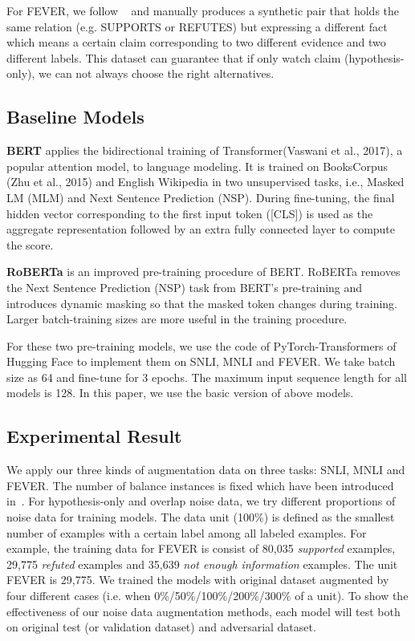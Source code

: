 For FEVER, we follow ~\shortcite{} and manually produces a synthetic pair that holds the same relation (e.g.
SUPPORTS or REFUTES) but expressing a different fact  which means a certain claim 
corresponding to two different evidence and two different labels.
This dataset can guarantee that if only watch claim (hypothesis-only), we 
can not always choose the right alternatives.

\subsection{Baseline Models}
\textbf{BERT} applies the bidirectional training of Transformer(Vaswani et al., 2017), 
a popular attention model, to language modeling. 
It is trained on BooksCorpus (Zhu et al., 2015) and English Wikipedia in two unsupervised
tasks, i.e., Masked LM (MLM) and Next Sentence Prediction (NSP). During fine-tuning, the final
hidden vector corresponding to the first input token ([CLS]) is used as the aggregate representation
followed by an extra fully connected layer to compute the score.

\textbf{RoBERTa} is an improved pre-training procedure of BERT. 
RoBERTa removes the Next Sentence Prediction (NSP) task from 
BERT’s pre-training  and introduces dynamic masking so that the 
masked token changes during training. 
Larger batch-training sizes are more useful in the training procedure.

For these two pre-training models, we use the code of PyTorch-Transformers of Hugging Face to implement them on SNLI, MNLI and FEVER. We take batch size as 64 and fine-tune for 3 epochs. The maximum input sequence length for all
models is 128. In this paper, we use the basic version of above models. 

\subsection{Experimental Result}
We apply our three kinds of augmentation data on three tasks: SNLI, MNLI and FEVER. 
The number of balance instances is fixed which have 
been introduced in~. 
For hypothesis-only and overlap noise data, we try different proportions 
of noise data for training models. The data unit (100\%) is defined as
the smallest number of examples with a certain label among all labeled examples. 
For example, the training data for FEVER is consist of 80,035 \textit{supported} examples, 
29,775 \textit{refuted} examples and 35,639 \textit{not enough information} examples. 
The unit FEVER is 29,775.
We trained the models with original dataset augmented by four different cases (i.e. when
0\%/50\%/100\%/200\%/300\% of a unit).
To show the effectiveness of our noise data augmentation methods, 
each model will test both on original test (or validation 
dataset) and adversarial dataset. 


